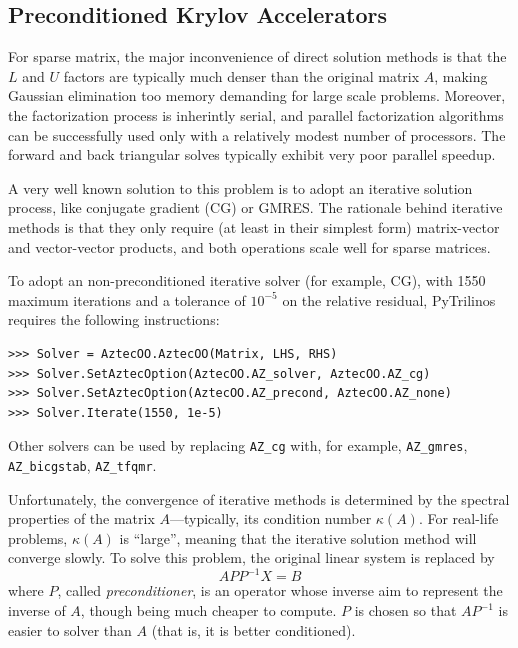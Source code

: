 \documentclass[10pt,relax]{SANDreport}
\begin{document}
\subsection{Preconditioned Krylov Accelerators}
\label{sec:iterative}

For sparse matrix, the major inconvenience of direct solution methods is that
the $L$ and $U$ factors are typically much denser than the original matrix
$A$, making Gaussian elimination too memory demanding for large scale
problems. Moreover, the factorization process is inherintly serial, and
parallel factorization algorithms can be successfully used only with a
relatively modest number of processors. The
forward and back triangular solves typically exhibit very poor parallel speedup.

A very well known solution to this problem is to adopt an iterative solution
process, like conjugate gradient (CG) or GMRES. The rationale behind
iterative methods is that they only require (at least in their simplest form)
matrix-vector and vector-vector products, and both operations scale well for
sparse matrices. 

To adopt an non-preconditioned iterative solver (for example, CG), with 1550
maximum iterations and a tolerance of $10^{-5}$ on the relative residual,
  PyTrilinos requires the following instructions:
\begin{verbatim}
>>> Solver = AztecOO.AztecOO(Matrix, LHS, RHS)
>>> Solver.SetAztecOption(AztecOO.AZ_solver, AztecOO.AZ_cg)
>>> Solver.SetAztecOption(AztecOO.AZ_precond, AztecOO.AZ_none)
>>> Solver.Iterate(1550, 1e-5)
\end{verbatim}
Other solvers can be used by replacing \verb!AZ_cg! with, for example,
  \verb!AZ_gmres!, \verb!AZ_bicgstab!, \verb!AZ_tfqmr!.

Unfortunately, the convergence of
iterative methods is determined by the spectral properties of the matrix
$A$---typically, its condition number $\kappa(A)$. For
real-life problems, $\kappa(A)$ is ``large'', meaning that the iterative
solution method will converge slowly. To solve this problem,
the original linear system is replaced by 
\[
A P P^{-1} X = B
\]
where $P$, called {\sl preconditioner}, is an operator whose inverse aim to
represent the inverse of $A$, though being much cheaper to compute.
$P$ is chosen so that $AP^{-1}$ is easier to solver than $A$ 
(that is, it is better conditioned). 

\smallskip
\end{document}
